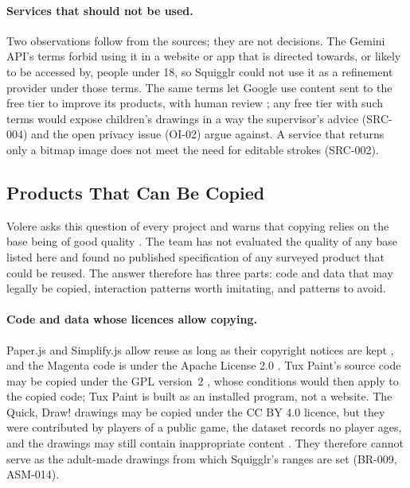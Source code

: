 \documentclass[12pt]{article}
\renewcommand{\_}{\textunderscore\allowbreak}%
\begin{document}
\paragraph{Services that should not be used.}
Two observations follow from the sources; they are not decisions. The Gemini
API's terms forbid using it in a website or app that is directed towards, or
likely to be accessed by, people under 18, so Squigglr could not use it as a
refinement provider under those terms. The same terms let Google use content
sent to the free tier to improve its products, with human review
\citep{Google2026GeminiTerms}; any free tier with such terms would expose
children's drawings in a way the supervisor's advice (SRC-004) and the open
privacy issue (OI-02) argue against. A service that returns only a bitmap image
does not meet the need for editable strokes (SRC-002).

\subsection{Products That Can Be Copied}
\label{sec:ots-copy}
Volere asks this question of every project and warns that copying relies on the
base being of good quality \citep{robertson2012volere}. The team has not
evaluated the quality of any base listed here and found no published
specification of any surveyed product that could be reused. The answer therefore
has three parts: code and data that may legally be copied, interaction patterns
worth imitating, and patterns to avoid.

\paragraph{Code and data whose licences allow copying.}
Paper.js and Simplify.js allow reuse as long as their copyright notices are kept
\citep{PaperJS2020License,Agafonkin2013SimplifyJS}, and the Magenta code is
under the Apache License 2.0 \citep{Magenta2016License}. Tux Paint's source code
may be copied under the GPL version~2 \citep{TuxPaint2026Download}, whose
conditions would then apply to the copied code; Tux Paint is built as an
installed program, not a website. The Quick, Draw! drawings may be copied under
the CC BY 4.0 licence, but they were contributed by players of a public game,
the dataset records no player ages, and the drawings may still contain
inappropriate content \citep{Google2017QuickDraw}. They therefore cannot serve
as the adult-made drawings from which Squigglr's ranges are set (BR-009,
ASM-014).
\end{document}
